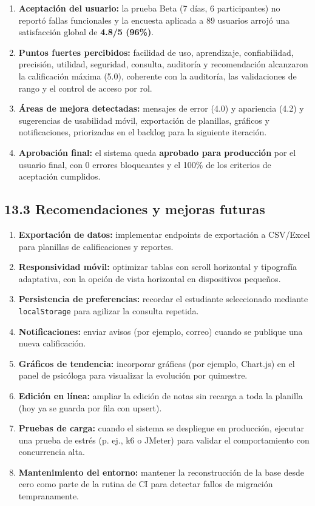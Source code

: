 \documentclass[11pt,a4paper]{article}
\begin{document}
\begin{enumerate}[leftmargin=*]
\item \textbf{Aceptación del usuario:} la prueba Beta (7 días, 6 participantes) no reportó fallas funcionales y la encuesta aplicada a 89 usuarios arrojó una satisfacción global de \textbf{4.8/5 (96\%)}.
\item \textbf{Puntos fuertes percibidos:} facilidad de uso, aprendizaje, confiabilidad, precisión, utilidad, seguridad, consulta, auditoría y recomendación alcanzaron la calificación máxima (5.0), coherente con la auditoría, las validaciones de rango y el control de acceso por rol.
\item \textbf{Áreas de mejora detectadas:} mensajes de error (4.0) y apariencia (4.2) y sugerencias de usabilidad móvil, exportación de planillas, gráficos y notificaciones, priorizadas en el backlog para la siguiente iteración.
\item \textbf{Aprobación final:} el sistema queda \textbf{aprobado para producción} por el usuario final, con 0 errores bloqueantes y el 100\% de los criterios de aceptación cumplidos.
\end{enumerate}


\subsection*{13.3 Recomendaciones y mejoras futuras}


\begin{enumerate}[leftmargin=*]
\item \textbf{Exportación de datos:} implementar endpoints de exportación a CSV/Excel para planillas de calificaciones y reportes.
\item \textbf{Responsividad móvil:} optimizar tablas con scroll horizontal y tipografía adaptativa, con la opción de vista horizontal en dispositivos pequeños.
\item \textbf{Persistencia de preferencias:} recordar el estudiante seleccionado mediante \texttt{localStorage} para agilizar la consulta repetida.
\item \textbf{Notificaciones:} enviar avisos (por ejemplo, correo) cuando se publique una nueva calificación.
\item \textbf{Gráficos de tendencia:} incorporar gráficas (por ejemplo, Chart.js) en el panel de psicóloga para visualizar la evolución por quimestre.
\item \textbf{Edición en línea:} ampliar la edición de notas sin recarga a toda la planilla (hoy ya se guarda por fila con upsert).
\item \textbf{Pruebas de carga:} cuando el sistema se despliegue en producción, ejecutar una prueba de estrés (p. ej., k6 o JMeter) para validar el comportamiento con concurrencia alta.
\item \textbf{Mantenimiento del entorno:} mantener la reconstrucción de la base desde cero como parte de la rutina de CI para detectar fallos de migración tempranamente.
\end{enumerate}
\end{document}
